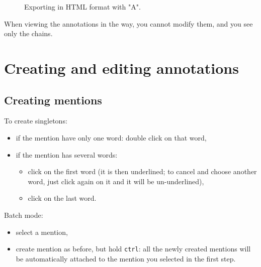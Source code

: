 \documentclass[12pt]{article}
\begin{document}
\begin{figure}
\begin{center}
\end{center}
\caption{Exporting in HTML format with "A".}
\label{fig:html-export-2}
\end{figure}

When viewing the annotations in the way, you cannot modify them, and you see
only the chains.



 \section{Creating and editing annotations}

 \subsection{Creating mentions}

\label{sec:creating-mentions}

To create singletons:
\begin{itemize}
   \item if the mention have only one word: double click on that word,
   \item if the mention has several words:
     \begin{itemize}
         \item click on the first word (it is then underlined; to cancel and
         choose another word, just click again on it and it will be
         un-underlined),
         \item click on the last word.
      \end{itemize}
\end{itemize}

Batch mode:
\begin{itemize}
   \item select a mention,
   \item create mention as before, but hold \verb|ctrl|: all the newly
   created mentions will be automatically attached to the mention you
   selected in the first step.
\end{itemize}
\end{document}
